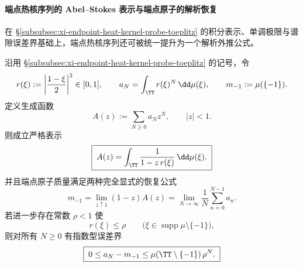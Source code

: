 \paragraph{端点热核序列的 Abel--Stokes 表示与端点原子的解析恢复}\label{subsubsec:xi-endpoint-heat-kernel-probe-abel-stokes-atom-recovery}
在 \S\ref{subsubsec:xi-endpoint-heat-kernel-probe-toeplitz} 的积分表示、单调极限与谱隙误差界基础上，端点热核序列还可被统一提升为一个解析外推公式。

\begin{theorem}\label{thm:xi-endpoint-heat-probe-abel-stokes-atom-recovery}
沿用 \S\ref{subsubsec:xi-endpoint-heat-kernel-probe-toeplitz} 的记号，令
\[
r(\xi):=\left|\frac{1-\xi}{2}\right|^2\in[0,1],
\qquad
a_N=\int_{\TT}r(\xi)^N\,\dd\mu(\xi),
\qquad
m_{-1}:=\mu(\{-1\}).
\]
定义生成函数
\[
A(z):=\sum_{N\ge 0}a_N z^N,\qquad |z|<1.
\]
则成立严格表示
\begin{equation}\label{eq:xi-endpoint-heat-probe-abel-stokes-genfun}
\boxed{\;
A(z)=\int_{\TT}\frac{1}{1-z\,r(\xi)}\,\dd\mu(\xi).\;}
\end{equation}
并且端点原子质量满足两种完全显式的恢复公式
\begin{equation}\label{eq:xi-endpoint-heat-probe-abel-stokes-recovery}
\boxed{\;
m_{-1}
=
\lim_{z\uparrow 1}(1-z)A(z)
=
\lim_{N\to\infty}\frac1N\sum_{n=0}^{N-1}a_n.\;}
\end{equation}
若进一步存在常数 \(\rho<1\) 使
\[
r(\xi)\le \rho
\qquad
\bigl(\xi\in\operatorname{supp}\mu\setminus\{-1\}\bigr),
\]
则对所有 \(N\ge 0\) 有指数型误差界
\begin{equation}\label{eq:xi-endpoint-heat-probe-abel-stokes-exp-bound}
\boxed{\;
0\le a_N-m_{-1}\le \mu(\TT\setminus\{-1\})\,\rho^N.\;}
\end{equation}
\end{theorem}

